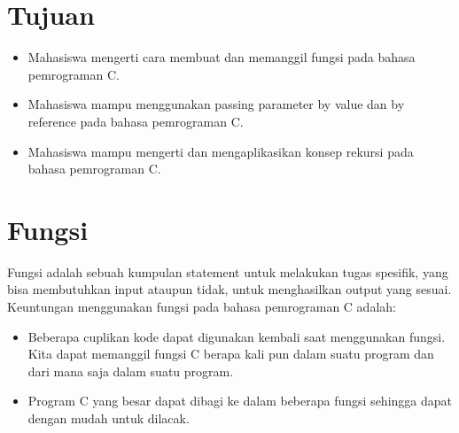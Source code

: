\section{Tujuan}
\begin{itemize}[label=$\bullet$, itemsep=-1pt, leftmargin=*]
    \item Mahasiswa mengerti cara membuat dan memanggil fungsi pada bahasa pemrograman C.
    \item Mahasiswa mampu menggunakan passing parameter by value dan by reference pada bahasa pemrograman C.
    \item Mahasiswa mampu mengerti dan mengaplikasikan konsep rekursi pada bahasa pemrograman C.

\end{itemize}

\section{Fungsi}
Fungsi adalah sebuah kumpulan statement untuk melakukan tugas spesifik, yang bisa membutuhkan input ataupun tidak, untuk menghasilkan output yang sesuai.
Keuntungan menggunakan fungsi pada bahasa pemrograman C adalah:
\begin{itemize}
    \item Beberapa cuplikan kode dapat digunakan kembali saat menggunakan fungsi.
          Kita dapat memanggil fungsi C berapa kali pun dalam suatu program dan dari mana saja dalam suatu program.
    \item Program C yang besar dapat dibagi ke dalam beberapa fungsi sehingga dapat dengan mudah untuk dilacak.
\end{itemize}
